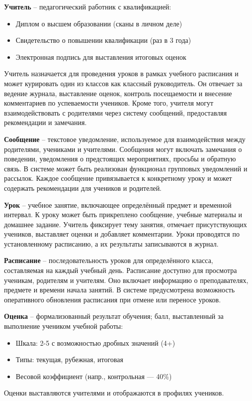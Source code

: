 \documentclass[a4paper, final]{article}
\begin{document}
\textbf{Учитель} -- педагогический работник с квалификацией:
\begin{itemize}
  \item Диплом о высшем образовании (сканы в личном деле)
  \item Свидетельство о повышении квалификации (раз в 3 года)
  \item Электронная подпись для выставления итоговых оценок
\end{itemize}

Учитель назначается для проведения уроков в рамках учебного расписания и может курировать один из классов как классный руководитель. Он отвечает за ведение журнала, выставление оценок, контроль посещаемости и внесение комментариев по успеваемости учеников. Кроме того, учителя могут взаимодействовать с родителями через систему сообщений, предоставляя рекомендации и замечания.

\textbf{Сообщение} -- текстовое уведомление, используемое для взаимодействия между родителями, учениками и учителями. Сообщения могут включать замечания о поведении, уведомления о предстоящих мероприятиях, просьбы и обратную связь. В системе может быть реализован функционал групповых уведомлений и рассылок. Каждое сообщение привязывается к конкретному уроку и может содержать рекомендации для учеников и родителей.

\textbf{Урок} -- учебное занятие, включающее определённый предмет и временной интервал. К уроку может быть прикреплено сообщение, учебные материалы и домашнее задание. Учитель фиксирует тему занятия, отмечает присутствующих учеников, выставляет оценки и добавляет комментарии. Уроки проводятся по установленному расписанию, а их результаты записываются в журнал.

\textbf{Расписание} -- последовательность уроков для определённого класса, составляемая на каждый учебный день. Расписание доступно для просмотра ученикам, родителям и учителям. Оно включает информацию о преподавателях, предмете и времени начала занятий. В системе предусмотрена возможность оперативного обновления расписания при отмене или переносе уроков.

\textbf{Оценка} -- формализованный результат обучения; балл, выставленный за выполнение учеником учебной работы: 
\begin{itemize}
  \item Шкала: 2-5 с возможностью дробных значений (4+)
  \item Типы: текущая, рубежная, итоговая
  \item Весовой коэффициент (напр., контрольная — 40\%)
\end{itemize}
Оценки выставляются учителями и отображаются в профилях учеников.
\end{document}
